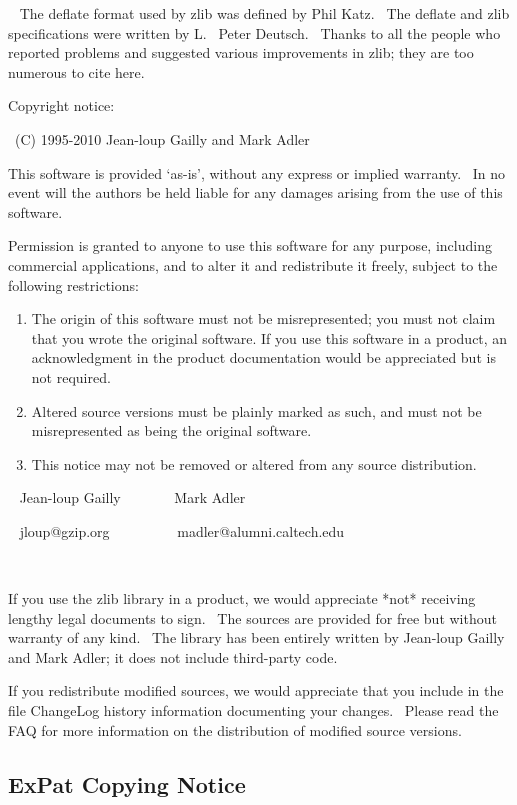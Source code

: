 ~ The deflate format used by zlib was defined by Phil Katz.~ The deflate and zlib specifications were written by L.~ Peter Deutsch.~ Thanks to all the people who reported problems and suggested various improvements in zlib; they are too numerous to cite here.

Copyright notice:

~(C) 1995-2010 Jean-loup Gailly and Mark Adler

This software is provided `as-is', without any express or implied warranty.~ In no event will the authors be held liable for any damages arising from the use of this software.

Permission is granted to anyone to use this software for any purpose, including commercial applications, and to alter it and redistribute it freely, subject to the following restrictions:

\begin{enumerate}
\def\labelenumi{\arabic{enumi}.}
\item
  The origin of this software must not be misrepresented; you must not claim that you wrote the original software. If you use this software in a product, an acknowledgment in the product documentation would be appreciated but is not required.
\item
  Altered source versions must be plainly marked as such, and must not be misrepresented as being the original software.
\item
  This notice may not be removed or altered from any source distribution.
\end{enumerate}

~ Jean-loup Gailly~~~~~~~ Mark Adler

~ jloup@gzip.org~~~~~~~~~ madler@alumni.caltech.edu

~

If you use the zlib library in a product, we would appreciate *not* receiving lengthy legal documents to sign.~ The sources are provided for free but without warranty of any kind.~ The library has been entirely written by Jean-loup Gailly and Mark Adler; it does not include third-party code.

If you redistribute modified sources, we would appreciate that you include in the file ChangeLog history information documenting your changes.~ Please read the FAQ for more information on the distribution of modified source versions.

\subsection{ExPat Copying Notice}\label{expat-copying-notice}

